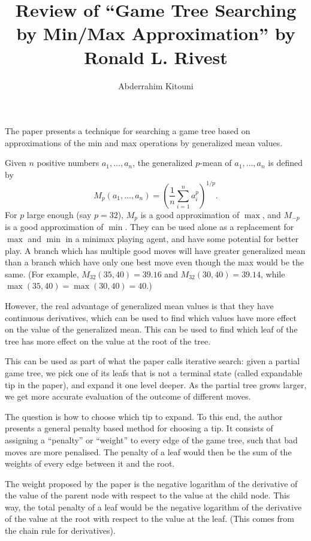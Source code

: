 \documentclass[11pt]{article}
\title{Review of ``Game Tree Searching by Min/Max Approximation'' by Ronald L. Rivest}
\author{Abderrahim Kitouni}
\begin{document}
\maketitle

The paper presents a technique for searching a game tree based on approximations of the min and max operations by generalized mean values.

Given $n$ positive numbers $a_1, \dots, a_n$, the generalized $p$-mean of $a_1, \dots, a_n$ is defined by
\[
  M_p(a_1, \dots, a_n) = \left(\frac{1}{n} \sum_{i=1}^n a_i^p \right)^{1/p}.
\]
For $p$ large enough (say $p=32$), $M_p$ is a good approximation of $\max$, and $M_{-p}$ is a good approximation of $\min$. They can be used alone as a replacement for $\max$ and $\min$ in a minimax playing agent, and have some potential for better play. A branch which has multiple good moves will have greater generalized mean than a branch which have only one best move even though the max would be the same. (For example, $M_{32}(35, 40) = 39.16$ and $M_{32}(30, 40) = 39.14$, while $\max(35, 40) = \max(30, 40) = 40$.)

However, the real advantage of generalized mean values is that they have continuous derivatives, which can be used to find which values have more effect on the value of the generalized mean. This can be used to find which leaf of the tree has more effect on the value at the root of the tree.

This can be used as part of what the paper calls iterative search: given a partial game tree, we pick one of its leafs that is not a terminal state (called expandable tip in the paper), and expand it one level deeper. As the partial tree grows larger, we get more accurate evaluation of the outcome of different moves.

The question is how to choose which tip to expand. To this end, the author presents a general penalty based method for choosing a tip. It consists of assigning a ``penalty'' or ``weight'' to every edge of the game tree, such that bad moves are more penalised. The penalty of a leaf would then be the sum of the weights of every edge between it and the root.

The weight proposed by the paper is the negative logarithm of the derivative of the value of the parent node with respect to the value at the child node. This way, the total penalty of a leaf would be the negative logarithm of the derivative of the value at the root with respect to the value at the leaf. (This comes from the chain rule for derivatives).
\end{document}
